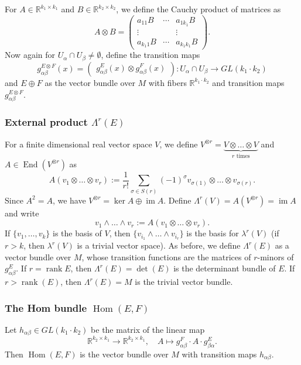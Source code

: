 \documentclass[10pt, a4paper]{article}
\newcommand{\R}{\mathbb {R}}
\DeclareMathOperator{\im}{im}
\DeclareMathOperator{\en}{End}
\DeclareMathOperator{\ho}{Hom}
\DeclareMathOperator{\rank}{rank}
\begin{document}
For $A \in \R^{k_1 \times k_1}$ and $B \in \R^{k_2 \times k_2}$, we define the Cauchy product of matrices as 
$$A \otimes B = \begin{pmatrix}
  a_{11} B & \cdots & a_{1 k_1} B\\
  \vdots & & \vdots\\
  a_{k_1 1} B & \cdots & a_{k_1 k_1} B
\end{pmatrix}.$$
Now again for $U_\alpha \cap U_\beta \neq \emptyset$, define the transition maps 
$$g_{\alpha \beta} ^{E \otimes F} (x) = \begin{pmatrix}
  g_{\alpha \beta} ^E (x) \otimes g_{\alpha \beta} ^F (x)
\end{pmatrix}: U_\alpha \cap U_\beta \to GL(k_1 \cdot k_2)$$
and $E \oplus F$ as the vector bundle over $M$ with fibers $\R^{k_1 \cdot k_2}$ and transition maps $g_{\alpha \beta} ^{E \otimes F}$.


\subsubsection*{External product $\Lambda^r (E)$}

For a finite dimensional real vector space $V$, we define $V^{\otimes r} = \underbrace{V \otimes \dots \otimes V}_{\textrm{$r$ times}}$ and $A \in \en (V^{\otimes r })$ 
as $$A(v_1 \otimes \dots \otimes v_r) := \frac{1}{r!} \sum_{\sigma \in S(r)} (-1)^{\sigma} v_{\sigma(1)} \otimes \dots \otimes v_{\sigma (r)}.$$
Since $A^2 = A$, we have $V ^{\otimes r} = \ker A \oplus \im A$. Define $\Lambda^r (V) = A(V^{\otimes r}) = \im A$ and write 
$$v_1 \wedge \dots \wedge v_r := A(v_1 \otimes \dots \otimes v_r).$$
If $\{v_1, \dots, v_k\}$ is the basis of $V$, then $\{v_{i_1} \wedge \dots \wedge v_{i_r}\}$ is the basis for $\lambda^r (V)$ (if $r > k$, then $\lambda^r (V)$ is a trivial vector space).
As before, we define $\Lambda^r (E)$ as a vector bundle over $M$, whose transition functions are 
the matrices of $r$-minors of $g_{\alpha \beta} ^E$. If $r = \rank E$, then $\Lambda^r (E) = \det (E)$ is the determinant bundle of $E$.
If $r >  \rank (E)$, then $\Lambda^r (E) = M$ is the trivial vector bundle.

\subsubsection*{The Hom bundle $\ho (E, F)$}

Let $h_{\alpha \beta} \in GL (k_1 \cdot k_2)$ be the matrix of the linear map 
$$\R^{k_2 \times k_1} \to \R^{k_2 \times k_1},\quad A \mapsto g_{\alpha \beta} ^F \cdot A \cdot g_{\beta \alpha } ^E.$$
Then $\ho (E, F)$ is the vector bundle over $M$ with transition maps $h_{\alpha \beta}$.
\end{document}
